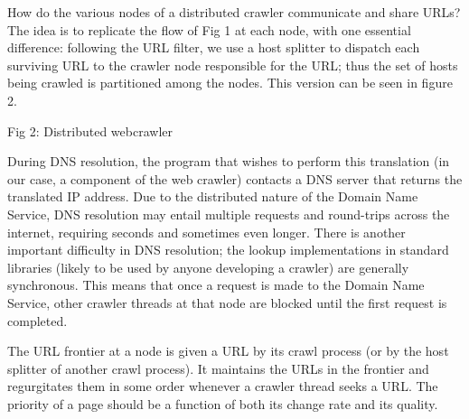 How do the various nodes of a distributed crawler communicate and share URLs? The idea is to replicate the flow of Fig 1 at each node, with one essential difference: following the URL filter, we use a host splitter to dispatch each surviving URL to the crawler node responsible for the URL; thus the set of hosts being crawled is partitioned among the nodes. This version can be seen in figure 2.


Fig 2: Distributed webcrawler

During DNS resolution, the program that wishes to perform this translation (in our case, a component of the web crawler) contacts a DNS server that returns the translated IP address.
Due to the distributed nature of the Domain Name Service, DNS resolution may entail multiple requests and round-trips across the internet, requiring seconds and sometimes even longer. There is another important difficulty in DNS resolution; the lookup implementations in standard libraries (likely to be used by anyone developing a crawler) are generally synchronous. This means that once a request is made to the Domain Name Service, other crawler threads at that node are blocked until the first request is completed.

The URL frontier at a node is given a URL by its crawl process (or by the host splitter of another crawl process). It maintains the URLs in the frontier and regurgitates them in some order whenever a crawler thread seeks a URL. The priority of a page should be a function of both its change rate and its quality.
